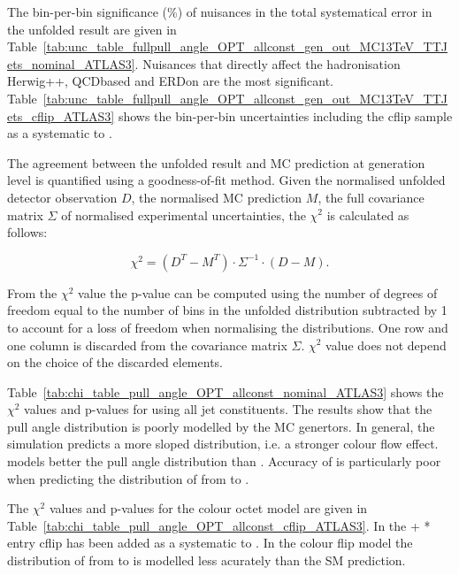 The bin-per-bin significance (\%) of nuisances in the total systematical error in the unfolded result are given in Table~\ref{tab:unc_table_fullpull_angle_OPT_allconst_gen_out_MC13TeV_TTJets_nominal_ATLAS3}. Nuisances that directly affect the hadronisation \ttbar Herwig++, \ttbar QCDbased and \ttbar ERDon are the most significant. Table~\ref{tab:unc_table_fullpull_angle_OPT_allconst_gen_out_MC13TeV_TTJets_cflip_ATLAS3} shows the bin-per-bin uncertainties including the \ttbar cflip sample as a systematic to \ttbar.

The agreement between the unfolded result and MC prediction at generation level is quantified using a goodness-of-fit method. Given the normalised unfolded detector observation $D$, the normalised MC prediction $M$, the full covariance matrix $\Sigma$ of normalised experimental uncertainties, the $\chi^{2}$ is calculated as follows:

\begin{equation}
  \chi^{2}=(D^{T}-M^{T})\cdot\Sigma^{-1}\cdot(D-M).
  \label{eq:chi2}
\end{equation}

From the $\chi^{2}$ value the p-value can be computed using the number of degrees of freedom equal to the number of bins in the unfolded distribution subtracted by 1 to account for a loss of freedom when normalising the distributions. One row and one column is discarded from the covariance matrix $\Sigma$. $\chi^{2}$ value does not depend on the choice of the discarded elements.

Table~\ref{tab:chi_table_pull_angle_OPT_allconst_nominal_ATLAS3} shows the $\chi^{2}$ values and p-values for \pullangle using all jet constituents. The results show that the pull angle distribution is poorly modelled by the MC genertors. In general, the simulation predicts a more sloped distribution, i.e. a stronger colour flow effect. \HERWIGpp models better the pull angle distribution than . Accuracy of  is particularly poor when predicting the distribution of \pullangle from \scndleadingjet to \leadingjet.

The $\chi^{2}$ values and p-values for the \PW colour octet model are given in Table~\ref{tab:chi_table_pull_angle_OPT_allconst_cflip_ATLAS3}. In the \POWHEG+ * entry \ttbar cflip has been added as a systematic to \ttbar. In the colour flip model the distribution of \pullangle from \leadingjet to \scndleadingjet is modelled less acurately than the SM prediction.
  

